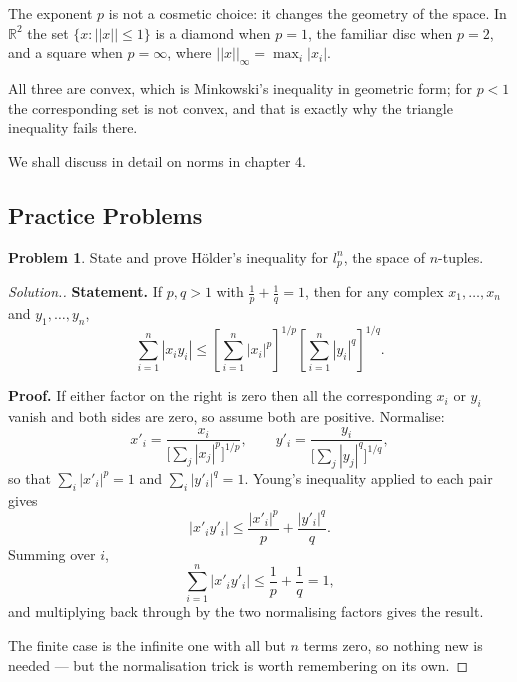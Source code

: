 \documentclass[11pt,a4paper]{article}
\theoremstyle{definition}
\newtheorem{problemx}{Problem}[section]
\newenvironment{problem}{\begin{problemx}}{\end{problemx}}
\newenvironment{solution}
  {\renewcommand{\qedsymbol}{}\begin{proof}[\textit{Solution}.]}
  {\end{proof}}
\begin{document}
The exponent $p$ is not a cosmetic choice: it changes the geometry of the space.
In $\mathbb{R}^2$ the set $\{x:||x||\leq 1\}$ is a diamond when $p=1$, the
familiar disc when $p=2$, and a square when $p=\infty$, where
$||x||_{\infty}=\max_i|x_i|$.

\begin{figure}[H]
\centering
{}
\end{figure}

All three are convex, which is Minkowski's inequality in geometric form; for
$p<1$ the corresponding set is not convex, and that is exactly why the triangle
inequality fails there.


We shall discuss in detail on norms in chapter 4.

\subsection{Practice Problems}

\begin{problem}
State and prove H\"older's inequality for $l_p^n$, the space of $n$-tuples.
\end{problem}
\begin{solution}
\textbf{Statement.} If $p,q>1$ with $\frac1p+\frac1q=1$, then for any complex
$x_1,\dots,x_n$ and $y_1,\dots,y_n$,
$$\sum_{i=1}^{n}|x_iy_i|\leq\left[\sum_{i=1}^{n}|x_i|^p\right]^{1/p}
\left[\sum_{i=1}^{n}|y_i|^q\right]^{1/q}.$$

\textbf{Proof.} If either factor on the right is zero then all the
corresponding $x_i$ or $y_i$ vanish and both sides are zero, so assume both are
positive. Normalise:
$$x'_i=\frac{x_i}{\big[\sum_j |x_j|^p\big]^{1/p}},\qquad
  y'_i=\frac{y_i}{\big[\sum_j |y_j|^q\big]^{1/q}},$$
so that $\sum_i|x'_i|^p=1$ and $\sum_i|y'_i|^q=1$. Young's inequality applied
to each pair gives
$$|x'_iy'_i|\leq\frac{|x'_i|^p}{p}+\frac{|y'_i|^q}{q}.$$
Summing over $i$,
$$\sum_{i=1}^{n}|x'_iy'_i|\leq\frac{1}{p}+\frac{1}{q}=1 ,$$
and multiplying back through by the two normalising factors gives the result.

The finite case is the infinite one with all but $n$ terms zero, so nothing new
is needed --- but the normalisation trick is worth remembering on its own.
\end{solution}
\end{document}
